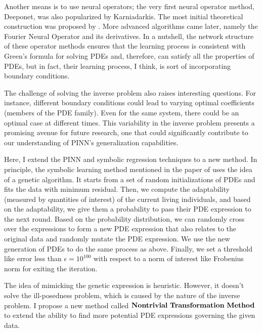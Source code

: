 \documentclass[12pt]{article}
\begin{document}
Another means is to use neural operators; the very first neural operator method, Deeponet, was also popularized by Karniadarkis. The most initial theoretical construction was proposed by \citet{392253}. More advanced algorithms came later, namely the Fourier Neural Operator and its derivatives. In a nutshell, the network structure of these operator methods ensures that the learning process is consistent with Green's formula for solving PDEs and, therefore, can satisfy all the properties of PDEs, but in fact, their learning process, I think, is sort of incorporating boundary conditions.

The challenge of solving the inverse problem also raises interesting questions. For instance, different boundary conditions could lead to varying optimal coefficients (members of the PDE family). Even for the same system, there could be an optimal case at different times. This variability in the inverse problem presents a promising avenue for future research, one that could significantly contribute to our understanding of PINN's generalization capabilities. 

Here, I extend the PINN and symbolic regression techniques to a new method. In principle, the symbolic learning method mentioned in the paper of \citet{PhysRevResearch.4.023174} uses the idea of a genetic algorithm. It starts from a set of random initializations of PDEs and fits the data with minimum residual. Then, we compute the adaptability (measured by quantities of interest) of the current living individuals, and based on the adaptability, we give them a probability to pass their PDE expression to the next round. Based on the probability distribution, we can randomly cross over the expressions to form a new PDE expression that also relates to the original data and randomly mutate the PDE expression. We use the new generation of PDEs to do the same process as above. Finally, we set a threshold like error less than $\epsilon = 10^{100}$ with respect to a norm of interest like Frobenius norm for exiting the iteration.

The idea of mimicking the genetic expression is heuristic. However, it doesn't solve the ill-posedness problem, which is caused by the nature of the inverse problem. I propose a new method called ${\bf{Nontrivial\text{ }Transformation\text{ }  Method}}$ to extend the ability to find more potential PDE expressions governing the given data. 
\end{document}
